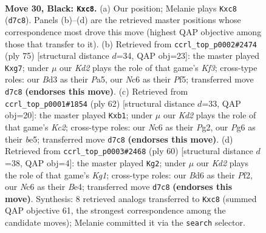 \documentclass[11pt]{article}
\begin{document}
\clearpage

\begin{figure}[p]\centering
\begin{subfigure}{0.46\textwidth}\centering
\resizebox{\linewidth}{!}{%
\newchessgame
\chessboard[
  setfen={2R5/p2k4/2nb2p1/6P1/8/3b4/3B4/4K1N1 b - - 0 30},
  showmover=false,
  pgfstyle=straightmove, color=movearrow, markmove={d7-c8}
]}
\caption{}
\end{subfigure}\hfill
\begin{subfigure}{0.46\textwidth}\centering
\resizebox{\linewidth}{!}{%
\newchessgame
\chessboard[
  setfen={8/6R1/1p2bk2/p4p2/P7/3B4/1PP5/4K3 b - - 0 38},
  showmover=false,
  pgfstyle=straightmove, color=movearrow, markmove={f6-g7}
]}
\caption{}
\end{subfigure}
\\[4pt]
\begin{subfigure}{0.46\textwidth}\centering
\resizebox{\linewidth}{!}{%
\newchessgame
\chessboard[
  setfen={8/4k1pp/8/3Bb3/4P2P/8/2K3P1/1r6 w - - 0 32},
  showmover=false,
  pgfstyle=straightmove, color=movearrow, markmove={c2-b1}
]}
\caption{}
\end{subfigure}\hfill
\begin{subfigure}{0.46\textwidth}\centering
\resizebox{\linewidth}{!}{%
\newchessgame
\chessboard[
  setfen={8/5kp1/4b3/R5p1/4B3/5P1P/1r3P2/6K1 w - - 1 31},
  showmover=false,
  pgfstyle=straightmove, color=movearrow, markmove={g1-g2}
]}
\caption{}
\end{subfigure}
\caption{\textbf{Move 30, Black: \texttt{Kxc8}.} (a) Our position; Melanie plays \texttt{Kxc8} (\texttt{d7c8}). Panels (b)--(d) are the retrieved master positions whose correspondence most drove this move (highest QAP objective among those that transfer to it). (b) Retrieved from \texttt{ccrl\_top\_p0002\#2474} (ply 75) [structural distance $d$=34, QAP obj=23]: the master played \texttt{Kxg7}; under $\mu$ our \emph{Kd2} plays the role of that game's \emph{Kf3}; cross-type roles: our \emph{B}d3 as their \emph{P}a5, our \emph{N}c6 as their \emph{P}f5; transferred move \texttt{d7c8} \textbf{(endorses this move)}. (c) Retrieved from \texttt{ccrl\_top\_p0001\#1854} (ply 62) [structural distance $d$=33, QAP obj=20]: the master played \texttt{Kxb1}; under $\mu$ our \emph{Kd2} plays the role of that game's \emph{Kc2}; cross-type roles: our \emph{N}c6 as their \emph{P}g2, our \emph{P}g6 as their \emph{b}e5; transferred move \texttt{d7c8} \textbf{(endorses this move)}. (d) Retrieved from \texttt{ccrl\_top\_p0003\#2468} (ply 60) [structural distance $d$=38, QAP obj=4]: the master played \texttt{Kg2}; under $\mu$ our \emph{Kd2} plays the role of that game's \emph{Kg1}; cross-type roles: our \emph{B}d6 as their \emph{P}f2, our \emph{N}c6 as their \emph{B}e4; transferred move \texttt{d7c8} \textbf{(endorses this move)}. Synthesis: 8 retrieved analogs transferred to \texttt{Kxc8} (summed QAP objective 61, the strongest correspondence among the candidate moves); Melanie committed it via the \texttt{search} selector.}
\label{fig:thought-m59}
\end{figure}
\end{document}
